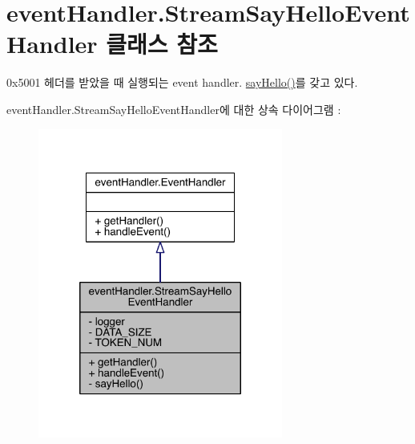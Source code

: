 \hypertarget{classevent_handler_1_1_stream_say_hello_event_handler}{\section{event\+Handler.\+Stream\+Say\+Hello\+Event\+Handler 클래스 참조}
\label{classevent_handler_1_1_stream_say_hello_event_handler}
}


0x5001 헤더를 받았을 때 실행되는 event handler. \hyperlink{classevent_handler_1_1_stream_say_hello_event_handler_a6af4d6b8a6ed973d984a2eea55e405bc}{say\+Hello()}를 갖고 있다.  




event\+Handler.\+Stream\+Say\+Hello\+Event\+Handler에 대한 상속 다이어그램 \+: 
\nopagebreak
\begin{figure}[H]
\begin{center}
\leavevmode
\includegraphics[width=228pt]{classevent_handler_1_1_stream_say_hello_event_handler__inherit__graph}
\end{center}
\end{figure}


